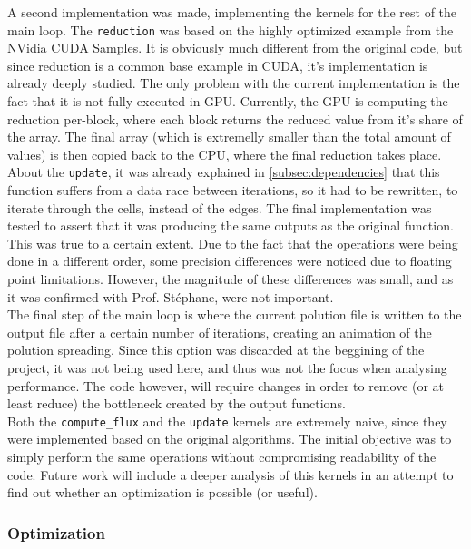 \documentclass[9pt,twocolumn]{scrartcl}
\begin{document}
A second implementation was made, implementing the kernels for the rest of the main loop. The \texttt{reduction} was based on the highly optimized example from the NVidia CUDA Samples. It is obviously much different from the original code, but since reduction is a common base example in CUDA, it's implementation is already deeply studied. The only problem with the current implementation is the fact that it is not fully executed in GPU. Currently, the GPU is computing the reduction per-block, where each block returns the reduced value from it's share of the array. The final array (which is extremelly smaller than the total amount of values) is then copied back to the CPU, where the final reduction takes place.\\

About the \texttt{update}, it was already explained in \autoref{subsec:dependencies} that this function suffers from a data race between iterations, so it had to be rewritten, to iterate through the cells, instead of the edges. The final implementation was tested to assert that it was producing the same outputs as the original function. This was true to a certain extent. Due to the fact that the operations were being done in a different order, some precision differences were noticed due to floating point limitations. However, the magnitude of these differences was small, and as it was confirmed with Prof. Stéphane, were not important.\\

The final step of the main loop is where the current polution file is written to the output file after a certain number of iterations, creating an animation of the polution spreading. Since this option was discarded at the beggining of the project, it was not being used here, and thus was not the focus when analysing performance. The code however, will require changes in order to remove (or at least reduce) the bottleneck created by the output functions.\\

Both the \texttt{compute\_flux} and the \texttt{update} kernels are extremely naive, since they were implemented based on the original algorithms. The initial objective was to simply perform the same operations without compromising readability of the code. Future work will include a deeper analysis of this kernels in an attempt to find out whether an optimization is possible (or useful).

\subsubsection{Optimization}
\end{document}
